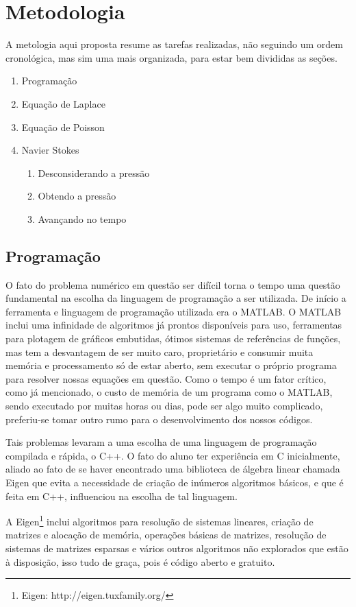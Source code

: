 \documentclass[journal]{IEEEtran}
\begin{document}
\section{Metodologia}
A metologia aqui proposta resume as tarefas realizadas, não seguindo um ordem cronológica, mas sim uma mais organizada, para estar bem divididas as seções.
\begin{enumerate}
  \item[A.] Programação
  \item[B.] Equação de Laplace
  \item[C.] Equação de Poisson
  \item[D.] Navier Stokes
  \begin{enumerate}
  \item[1.] Desconsiderando a pressão
  \item[2.] Obtendo a pressão
  \item[3.] Avançando no tempo
  \end{enumerate}
\end{enumerate}
\subsection{Programação}
O fato do problema numérico em questão ser difícil torna o tempo uma questão fundamental na escolha da linguagem de programação a ser utilizada. De início a ferramenta e linguagem de programação utilizada era o MATLAB\textregistered. O MATLAB inclui uma infinidade de algoritmos já prontos disponíveis para uso, ferramentas para plotagem de gráficos embutidas, ótimos sistemas de referências de funções, mas tem a desvantagem de ser muito caro, proprietário e consumir muita memória e processamento só de estar aberto, sem executar o próprio programa para resolver nossas equações em questão. Como o tempo é um fator crítico, como já mencionado, o custo de memória de um programa como o MATLAB, sendo executado por muitas horas ou dias, pode ser algo muito complicado, preferiu-se tomar outro rumo para o desenvolvimento dos nossos códigos.

Tais problemas levaram a uma escolha de uma linguagem de programação compilada e rápida, o C++. O fato do aluno ter experiência em C inicialmente, aliado ao fato de se haver encontrado uma biblioteca de álgebra linear chamada Eigen que evita a necessidade de criação de inúmeros algoritmos básicos, e que é feita em C++, influenciou na escolha de tal linguagem.

A Eigen\footnote{Eigen: http://eigen.tuxfamily.org/} inclui algoritmos para resolução de sistemas lineares, criação de matrizes e alocação de memória, operações básicas de matrizes, resolução de sistemas de matrizes esparsas e vários outros algoritmos não explorados que estão à disposição, isso tudo de graça, pois é código aberto e gratuito. 
\end{document}
